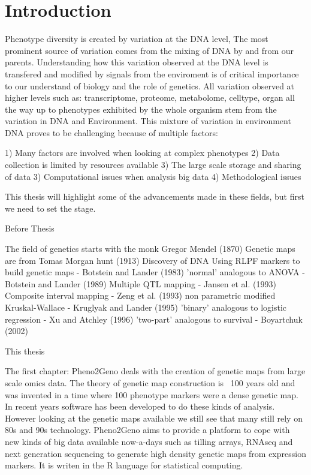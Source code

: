 \chapter{Introduction}
Phenotype diversity is created by variation at the DNA level, The most prominent source of variation comes 
from the mixing of DNA by and from our parents. Understanding how this variation observed at the DNA level 
is transfered and modified by signals from the enviroment is of critical importance to our understand of 
biology and the role of genetics. All variation observed at higher levels such as: transcriptome, proteome, 
metabolome, celltype, organ all the way up to phenotypes exhibited by the whole organism stem from the 
variation in DNA and Environment. This mixture of variation in environment DNA proves to be challenging 
because of multiple factors:

1) Many factors are involved when looking at complex phenotypes
2) Data collection is limited by resources available
3) The large scale storage and sharing of data
3) Computational issues when analysis big data
4) Methodological issues

This thesis will highlight some of the advancements made in these fields, but first we need to set the stage.

Before Thesis

The field of genetics starts with the monk Gregor Mendel (1870)
Genetic maps are from Tomas Morgan hunt (1913)
Discovery of DNA
Using RLPF markers to build genetic maps - Botstein and Lander (1983)
'normal' analogous to ANOVA - Botstein and Lander (1989)
Multiple QTL mapping - Jansen et al. (1993)
Composite interval mapping -  Zeng et al. (1993)
non parametric modified Kruskal-Wallace - Kruglyak and Lander (1995)
'binary' analogous to logistic regression - Xu and Atchley (1996)
'two-part' analogous to survival - Boyartchuk (2002)


This thesis

The first chapter: Pheno2Geno deals with the creation of genetic maps from large scale omics data. The theory 
of genetic map construction is ~100 years old and was invented in a time where 100 phenotype markers were a 
dense genetic map. In recent years software has been developed to do these kinds of analysis. However looking 
at the genetic maps available we still see that many still rely on 80s and 90s technology. Pheno2Geno aims to 
provide a platform to cope with new kinds of big data available now-a-days such as tilling arrays, RNAseq and 
next generation sequencing to generate high density genetic maps from expression markers. It is writen in the 
R language for statistical computing.

